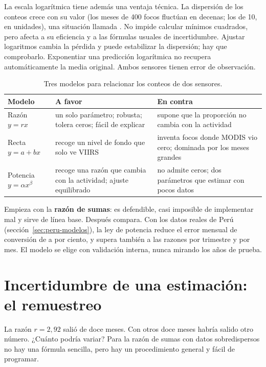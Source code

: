La escala logarítmica tiene además una ventaja técnica. La dispersión de los conteos crece con
su valor (los meses de 400 focos fluctúan en decenas; los de 10, en unidades), una situación
llamada . No impide calcular mínimos cuadrados, pero afecta
a su eficiencia y a las fórmulas usuales de incertidumbre. Ajustar logaritmos cambia
la pérdida y puede estabilizar la dispersión; hay que comprobarlo. Exponentiar una
predicción logarítmica no recupera automáticamente la media original. Ambos sensores
tienen error de observación.

\begin{table}[ht]
\centering
\renewcommand{\arraystretch}{1.25}
\begin{tabularx}{\textwidth}{l>{\raggedright\arraybackslash}X>{\raggedright\arraybackslash}X}
\toprule
Modelo & A favor & En contra \\
\midrule
Razón $y = r x$ & un solo parámetro; robusta; tolera ceros; fácil de explicar & supone que la proporción no cambia con la actividad \\
Recta $y = a + bx$ & recoge un nivel de fondo que solo ve VIIRS & inventa focos donde MODIS vio cero; dominada por los meses grandes \\
Potencia $y = \alpha x^\beta$ & recoge una razón que cambia con la actividad; ajuste equilibrado & no admite ceros; dos parámetros que estimar con pocos datos \\
\bottomrule
\end{tabularx}
\caption{Tres modelos para relacionar los conteos de dos sensores.}
\label{tab:modelos}
\end{table}

\begin{parareto}
Empieza con la \textbf{razón de sumas}: es defendible, casi imposible de implementar mal y
sirve de línea base. Después compara. Con los datos reales de Perú
(sección~\ref{sec:peru-modelos}), la ley de potencia reduce el error mensual de conversión de
\PeruWAPE{} a \PeruPotWAPE{} por ciento, y supera también a las razones por trimestre y por
mes. El modelo se elige con validación interna, nunca mirando los años de prueba.
\end{parareto}

\section{Incertidumbre de una estimación: el remuestreo}\label{sec:bootstrap}

La razón $r = 2{,}92$ salió de doce meses. Con otros doce meses habría salido otro número. ¿Cuánto
podría variar? Para la razón de sumas con datos sobredispersos no hay una fórmula sencilla, pero
hay un procedimiento general y fácil de programar.

